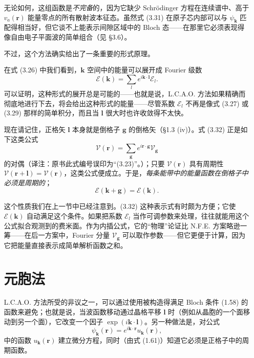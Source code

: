 无论如何，这组函数是\emph{不完备}的，因为它缺少 Schr\"odinger 方程在连续谱中、高于 $v_a(\mathbf{r})$ 能量零点的所有散射波本征态。虽然式 (3.31) 在原子芯内部可以与 $\psi_{\mathbf{k}}$ 匹配得相当好，但它谈不上能表示间隙区域中的 Bloch 态——在那里它必须表现得像自由电子平面波的简单组合（见 §3.6）。

不过，这个方法确实给出了一条重要的形式原理。

在式 (3.26) 中我们看到，$\mathbf{k}$ 空间中的能量可以展开成 Fourier 级数
\begin{equation*}
\mathcal{E}(\mathbf{k})=\sum_{l}e^{i\mathbf{k}\cdot\mathbf{l}}\mathcal{E}_l.
\tag{3.32}
\end{equation*}
可以证明，这种形式的展开总是可能的——也就是说，L.C.A.O. 方法如果精确而彻底地进行下去，将会给出这种形式的能量——尽管系数 $\mathcal{E}_l$ 不再是像式 (3.27) 或 (3.29) 那样的简单积分，而且当 $\mathbf{l}$ 很大时也许收敛得不太快。

现在请记住，正格矢 $\mathbf{l}$ 本身就是倒格子 $\mathbf{g}$ 的倒格矢（§1.3 (iv)）。式 (3.32) 正是如下这类公式
\begin{equation*}
\mathcal{V}(\mathbf{r})=\sum_{\mathbf{g}}e^{i\mathbf{r}\cdot\mathbf{g}}\mathcal{V}_{\mathbf{g}}
\tag{3.33}
\end{equation*}
的对偶（译注：原书此式编号误印为“(3.23)”。）；只要 $\mathcal{V}(\mathbf{r})$ 具有周期性 $\mathcal{V}(\mathbf{r}+\mathbf{l})=\mathcal{V}(\mathbf{r})$，这类公式便成立。于是，\emph{每条能带中的能量函数在倒格子中必须是周期的}；
\begin{equation*}
\mathcal{E}(\mathbf{k}+\mathbf{g})=\mathcal{E}(\mathbf{k}).
\tag{3.34}
\end{equation*}

这个性质我们在上一节中已经注意到。(3.32) 这种表示式有时颇为方便；它使 $\mathcal{E}(\mathbf{k})$ 自动满足这个条件。如果把系数 $\mathcal{E}_l$ 当作可调参数来处理，往往就能用这个公式拟合观测到的费米面。作为内插公式，它的“物理”论证比 N.F.E. 方案略逊一筹——在后一方案中，Fourier 分量 $\mathcal{V}_{\mathbf{g}}$ 可以取作参数——但它更便于计算，因为它把能量直接表示成简单解析函数之和。

\section{元胞法}

L.C.A.O. 方法所受的非议之一，可以通过使用被构造得满足 Bloch 条件 (1.58) 的函数来避免；也就是说，当波函数移动通过晶格平移 $\mathbf{l}$ 时（例如从晶胞的一个面移动到另一个面），它改变一个因子 $\exp(i\mathbf{k}\cdot\mathbf{l})$。另一种做法是，对公式
\begin{equation*}
\psi_{\mathbf{k}}(\mathbf{r})=e^{i\mathbf{k}\cdot\mathbf{r}}u_{\mathbf{k}}(\mathbf{r}),
\tag{3.35}
\end{equation*}
中的函数 $u_{\mathbf{k}}(\mathbf{r})$ 建立微分方程，同时（由式 (1.61)）知道它必须是正格子中的周期函数。

